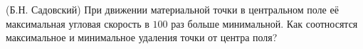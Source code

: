 (Б.Н. Садовский)
При движении материальной точки в центральном поле её максимальная
угловая скорость в $100$ раз больше минимальной. Как соотносятся максимальное
и минимальное удаления точки от центра поля?
